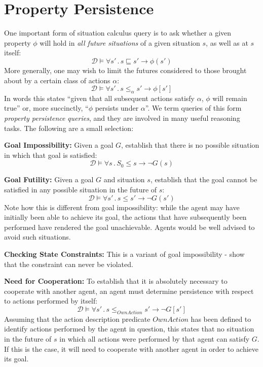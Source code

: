 \section{Property Persistence}

One important form of situation calculus query is to ask whether a
given property $\phi$ will hold in \emph{all future situations} of
a given situation $s$, as well as at $s$ itself:\[
\mathcal{D}\models\forall s'\,.\, s\sqsubseteq s'\rightarrow\phi(s')\]
 More generally, one may wish to limit the futures considered to those
brought about by a certain class of actions $\alpha$:\[
\mathcal{D}\models\forall s'\,.\, s\le_{\alpha}s'\rightarrow\phi[s']\]
 In words this states {}``given that all subsequent actions satisfy
$\alpha$, $\phi$ will remain true'' or, more succinctly, {}``$\phi$
persists under $\alpha$''. We term queries of this form \emph{property
persistence} \emph{queries}, and they are involved in many useful
reasoning tasks. The following are a small selection:

\textbf{Goal Impossibility:} Given a goal $G$, establish that there
is no possible situation in which that goal is satisfied:\[
\mathcal{D}\models\forall s\,.\, S_{0}\leq s\rightarrow\neg G(s)\]


\textbf{Goal Futility:} Given a goal $G$ and situation $s$, establish
that the goal cannot be satisfied in any possible situation in the
future of $s$:\[
\mathcal{D}\models\forall s'\,.\, s\leq s'\rightarrow\neg G(s')\]
 Note how this is different from goal impossibility: while the agent
may have initially been able to achieve its goal, the actions that
have subsequently been performed have rendered the goal unachievable.
Agents would be well advised to avoid such situations.

\textbf{Checking State Constraints:} This is a variant of goal impossibility
- show that the constraint can never be violated.

\textbf{Need for Cooperation:} To establish that it is absolutely
necessary to cooperate with another agent, an agent must determine
persistence with respect to actions performed by itself:\[
\mathcal{D}\models\forall s'\,.\, s\leq_{OwnAction}s'\rightarrow\neg G[s']\]
 Assuming that the action description predicate $OwnAction$ has been
defined to identify actions performed by the agent in question, this
states that no situation in the future of $s$ in which all actions
were performed by that agent can satisfy $G$. If this is the case,
it will need to cooperate with another agent in order to achieve its
goal.


